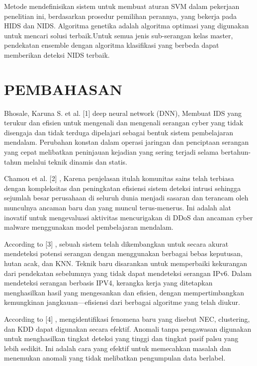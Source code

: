 \documentclass[conference]{IEEEtran}
\begin{document}
Metode mendefinisikan sistem untuk membuat aturan SVM dalam pekerjaan penelitian ini, berdasarkan prosedur pemilihan perannya, yang bekerja pada HIDS dan NIDS. Algoritma genetika adalah algoritma optimasi yang digunakan untuk mencari solusi terbaik.Untuk semua jenis sub-serangan kelas master, pendekatan ensemble dengan algoritma klasifikasi yang berbeda dapat memberikan deteksi NIDS terbaik.

\section{PEMBAHASAN}

Bhosale, Karuna S. et al. [1] \cite {bhosale2018modified} deep neural network (DNN), Membuat IDS yang terukur dan efisien untuk mengenali dan mengenali serangan cyber yang tidak disengaja dan tidak terduga dipelajari sebagai bentuk sistem pembelajaran mendalam. Perubahan konstan dalam operasi jaringan dan penciptaan serangan yang cepat melibatkan peninjauan kejadian yang sering terjadi selama bertahun-tahun melalui teknik dinamis dan statis.

Chamou et al. [2] \cite {chamou2019intrusion}, Karena penjelasan itulah komunitas sains telah terbiasa dengan kompleksitas dan peningkatan efisiensi sistem deteksi intrusi sehingga sejumlah besar perusahaan di seluruh dunia menjadi sasaran dan terancam oleh munculnya ancaman baru dan yang muncul terus-menerus. Ini adalah alat inovatif untuk mengevaluasi aktivitas mencurigakan di DDoS dan ancaman cyber malware menggunakan model pembelajaran mendalam.

According to [3] \cite {anbar2016comparative}, sebuah sistem telah dikembangkan untuk secara akurat mendeteksi potensi serangan dengan menggunakan berbagai bebas keputusan, hutan acak, dan KNN. Teknik baru disarankan untuk memperbaiki kekurangan dari pendekatan sebelumnya yang tidak dapat mendeteksi serangan IPv6. Dalam mendeteksi serangan berbasis IPV4, kerangka kerja yang ditetapkan menghasilkan hasil yang mengesankan dan efisien, dengan mempertimbangkan kemungkinan jangkauan—efisiensi dari berbagai algoritme yang telah diukur. 

According to [4] \cite {chen2017novel}, mengidentifikasi fenomena baru yang disebut NEC, clustering, dan KDD dapat digunakan secara efektif. Anomali tanpa pengawasan digunakan untuk menghasilkan tingkat deteksi yang tinggi dan tingkat pasif palsu yang lebih sedikit. Ini adalah cara yang efektif untuk memecahkan masalah dan menemukan anomali yang tidak melibatkan pengumpulan data berlabel.
\end{document}
